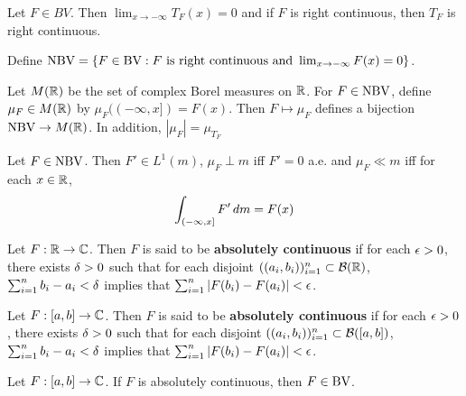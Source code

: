 \documentclass{book}
\begin{document}
	\begin{lem}
		Let $F \in BV$. Then $\lim_{x \rightarrow -\infty}T_F(x)=0$ and if $F$ is right continuous, then $T_F$ is right continuous.
	\end{lem}
	
	\begin{defn}  
		Define $\text{NBV}=\{F \in \text{BV}: F \text{ is right continuous and }\lim_{x \rightarrow -\infty}F(x)=0\}$.
	\end{defn}
	
	\begin{thm}
		Let $M(\mathbb{R})$ be the set of complex Borel measures on $\mathbb{R}$. For $F \in \text{NBV}$, define $\mu_F \in M(\mathbb{R})$ by $\mu_F((-\infty, x]) = F(x)$. Then $F \mapsto \mu_F$ defines a bijection $\text{NBV} \rightarrow M(\mathbb{R})$. In addition, $|\mu_F| = \mu_{T_F}$
	\end{thm}
	
	\begin{thm}
		Let $F \in \text{NBV}$. Then $F' \in L^1(m)$, $\mu_F \perp m$ iff $F' =0$ a.e. and $\mu_F \ll m$ iff for each $x \in \mathbb{R}$, $$\int_{(-\infty, x]}F'\, d m = F(x)$$
	\end{thm}
	
	\begin{defn}  
		Let $F: \mathbb{R} \rightarrow \mathbb{C}$. Then $F$ is said to be \textbf{absolutely continuous} if for each $\epsilon>0$, there exists $\delta>0$ such that for each disjoint $((a_i, b_i))_{i=1}^n \subset \mathcal{B}(\mathbb{R})$, $\sum_{i=1}^n b_i-a_i < \delta$ implies that $\sum_{i=1}^n|F(b_i)-F(a_i)| < \epsilon$.
	\end{defn}
	
	\begin{defn}  
		Let $F: [a,b] \rightarrow \mathbb{C}$. Then $F$ is said to be \textbf{absolutely continuous} if for each $\epsilon>0$, there exists $\delta>0$ such that for each disjoint $((a_i, b_i))_{i=1}^n \subset \mathcal{B}([a,b])$, $\sum_{i=1}^n b_i-a_i < \delta$ implies that $\sum_{i=1}^n|F(b_i)-F(a_i)| < \epsilon$.
	\end{defn}
	
	\begin{ex}  
		Let $F:[a,b] \rightarrow \mathbb{C}$. If $F$ is absolutely continuous, then $F \in \text{BV}$.
	\end{ex}
	
\end{document}
